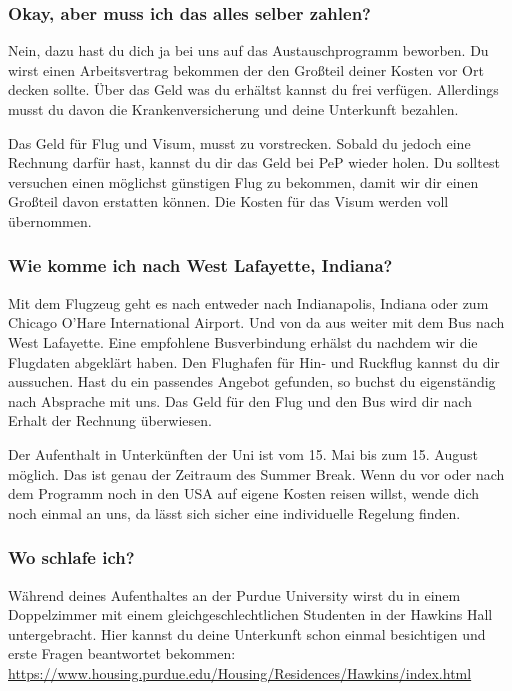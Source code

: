 \documentclass[
  paper=a4,
  fontsize=12pt,
  DIV=16,
  headheight=52pt,
  footheight=45pt,
  headinclude,
  parskip=full,
]{scrartcl}
\begin{document}
\subsubsection*{Okay, aber muss ich das alles selber zahlen?}
Nein, dazu hast du dich ja bei uns auf das Austauschprogramm beworben.
Du wirst einen Arbeitsvertrag bekommen der den Großteil deiner Kosten vor Ort
decken sollte.
Über das Geld was du erhältst kannst du frei verfügen.
Allerdings musst du davon die Krankenversicherung und deine Unterkunft bezahlen.

Das Geld für Flug und Visum, musst zu vorstrecken.
Sobald du jedoch eine Rechnung darfür hast, kannst du dir das Geld bei PeP
wieder holen.
Du solltest versuchen einen möglichst günstigen Flug zu bekommen, damit wir dir
einen Großteil davon erstatten können.
Die Kosten für das Visum werden voll übernommen.

\subsubsection*{Wie komme ich nach West Lafayette, Indiana?}
Mit dem Flugzeug geht es nach entweder nach Indianapolis, Indiana oder zum
Chicago O'Hare International Airport. Und von da aus weiter mit dem Bus nach
West Lafayette.
Eine empfohlene Busverbindung erhälst du nachdem wir die Flugdaten abgeklärt
haben.
Den Flughafen für Hin- und Ruckflug kannst du dir aussuchen.
Hast du ein passendes Angebot gefunden, so buchst du eigenständig nach Absprache
mit uns. Das Geld für den Flug und den Bus wird dir nach Erhalt der Rechnung
überwiesen.

Der Aufenthalt in Unterkünften der Uni ist vom 15. Mai bis zum 15. August
möglich. Das ist genau der Zeitraum des Summer Break. Wenn du vor oder nach dem
Programm noch in den USA auf eigene Kosten reisen willst, wende dich noch einmal
an uns, da lässt sich sicher eine individuelle Regelung finden.


\subsubsection*{Wo schlafe ich?}
Während deines Aufenthaltes an der Purdue University wirst du in einem
Doppelzimmer mit einem gleichgeschlechtlichen Studenten in der Hawkins Hall
untergebracht.
Hier kannst du deine Unterkunft schon einmal besichtigen und erste Fragen
beantwortet bekommen:
\url{https://www.housing.purdue.edu/Housing/Residences/Hawkins/index.html}
\end{document}
